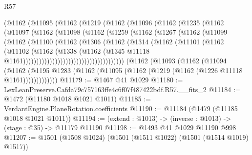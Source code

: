 \begin{lexlean}{R57}
\begin{coremodule}
                  (@1162
                    (@11095
                      (@1162
                        (@1219
                          (@1162
                            (@11096
                              (@1162
                                (@1235
                                  (@1162
                                    (@11097
                                      (@1162
                                        (@11098
                                          (@1162
                                            (@1259
                                              (@1162
                                                (@1267
                                                  (@1162
                                                    (@11099
                                                      (@1162
                                                        (@11100
                                                          (@1162
                                                            (@1306
                                                              (@1162
                                                                (@1314
                                                                  (@1162
                                                                    (@11101
                                                                      (@1162
                                                                        (@11102
                                                                          (@1162
                                                                            (@1338
                                                                              (@1162
                                                                                (@1345
                                                                                  @11118
                                                                                  @1161))))))))))))))))))))))))))))))))))))))
      (@1162
        (@11093
          (@1162
            (@11094
              (@1162
                (@1195 @1283 (@1162 (@11095 (@1162 (@1219 (@1162 (@1226 @11118 @1161)))))))))))))
@11179 := @1467 @41 @1029
@11180 := LexLeanPreserve.Cafda79c757163ffe4c6f07f487422bdf.R57.__fits_2
@11184 := @1472 (@11180 @1018 @1021 @1011)
@11185 := VerdantEngine.PlaneRotation.coefficients
@11190 := @11184 (@1479 (@11185 @1018 @1021 @1011))
@11194 := (extend : @1013) -> (inverse : @1013) -> (stage : @35) -> @11179 @11190
@11198 := @1493 @41 @1029 @11190 @998
@11207 := @1501 (@1508 @1024) (@1501 (@1511 @1022) (@1501 (@1514 @1019) @1517))

\end{coremodule}
\end{lexlean}
